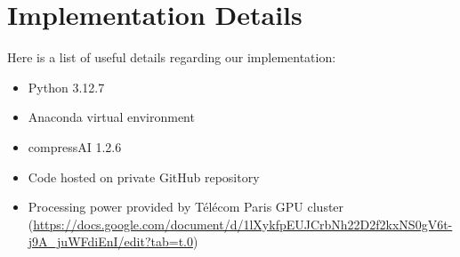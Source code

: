 \chapter{Implementation Details}
Here is a list of useful details regarding our implementation:
\begin{itemize}
    \item Python 3.12.7
    \item Anaconda virtual environment
    \item compressAI 1.2.6
    \item Code hosted on private GitHub repository
    \item Processing power provided by Télécom Paris GPU cluster (\url{https://docs.google.com/document/d/1lXykfpEUJCrbNh22D2f2kxNS0gV6t-j9A_juWFdiEnI/edit?tab=t.0})
\end{itemize}